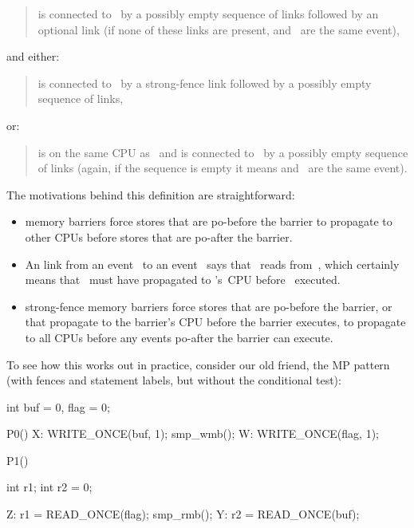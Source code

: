 \begin{quote}
	 is connected to~ by a possibly empty sequence of
	 links followed by an optional  link (if none of
	these links are present,  and~ are the same event),
\end{quote}

\noindent%
and either:

\begin{quote}
	 is connected to~ by a strong-fence link followed by a
	possibly empty sequence of  links,
\end{quote}

\noindent%
or:

\begin{quote}
	 is on the same CPU as~ and is connected to~
        by a possibly
	empty sequence of  links (again, if the sequence is empty it
	means  and~ are the same event).
\end{quote}

The motivations behind this definition are straightforward:

\begin{itemize}
\item	{} memory barriers force stores that are po-before
	the barrier to propagate to other CPUs before stores that are
	po-after the barrier.

\item	An  link from an event~ to an event~ says
	that ~reads
	from~, which certainly means that ~must have propagated to
	's~CPU before ~executed.

\item	strong-fence memory barriers force stores that are po-before
	the barrier, or that propagate to the barrier's CPU before the
	barrier executes, to propagate to all CPUs before any events
	po-after the barrier can execute.
\end{itemize}

To see how this works out in practice, consider our old friend, the MP
pattern (with fences and statement labels, but without the conditional
test):

\begin{VerbatimU}
	int buf = 0, flag = 0;

	P0()
	{
		X: WRITE_ONCE(buf, 1);
		   smp_wmb();
		W: WRITE_ONCE(flag, 1);
	}

	P1()
	{
		int r1;
		int r2 = 0;

		Z: r1 = READ_ONCE(flag);
		   smp_rmb();
		Y: r2 = READ_ONCE(buf);
	}
\end{VerbatimU}

